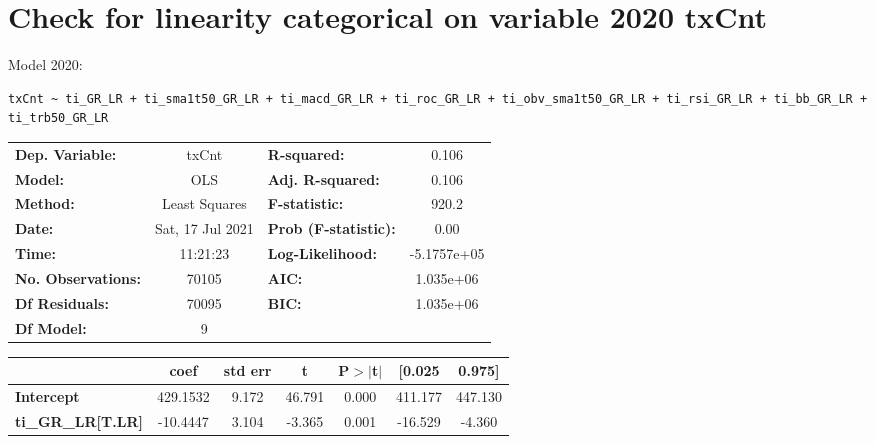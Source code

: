 \section{Check for linearity categorical on variable 2020 txCnt}

Model 2020: \begin{verbatim}txCnt ~ ti_GR_LR + ti_sma1t50_GR_LR + ti_macd_GR_LR + ti_roc_GR_LR + ti_obv_sma1t50_GR_LR + ti_rsi_GR_LR + ti_bb_GR_LR + ti_trb50_GR_LR\end{verbatim}

\begin{center}
\begin{tabular}{lclc}
\toprule
\textbf{Dep. Variable:}                 &      txCnt       & \textbf{  R-squared:         } &      0.106   \\
\textbf{Model:}                         &       OLS        & \textbf{  Adj. R-squared:    } &      0.106   \\
\textbf{Method:}                        &  Least Squares   & \textbf{  F-statistic:       } &      920.2   \\
\textbf{Date:}                          & Sat, 17 Jul 2021 & \textbf{  Prob (F-statistic):} &      0.00    \\
\textbf{Time:}                          &     11:21:23     & \textbf{  Log-Likelihood:    } & -5.1757e+05  \\
\textbf{No. Observations:}              &       70105      & \textbf{  AIC:               } &  1.035e+06   \\
\textbf{Df Residuals:}                  &       70095      & \textbf{  BIC:               } &  1.035e+06   \\
\textbf{Df Model:}                      &           9      & \textbf{                     } &              \\
\bottomrule
\end{tabular}
\begin{tabular}{lcccccc}
                                        & \textbf{coef} & \textbf{std err} & \textbf{t} & \textbf{P$> |$t$|$} & \textbf{[0.025} & \textbf{0.975]}  \\
\midrule
\textbf{Intercept}                      &     429.1532  &        9.172     &    46.791  &         0.000        &      411.177    &      447.130     \\
\textbf{ti\_GR\_LR[T.LR]}               &     -10.4447  &        3.104     &    -3.365  &         0.001        &      -16.529    &       -4.360     \\

\end{tabular}
\end{center}
